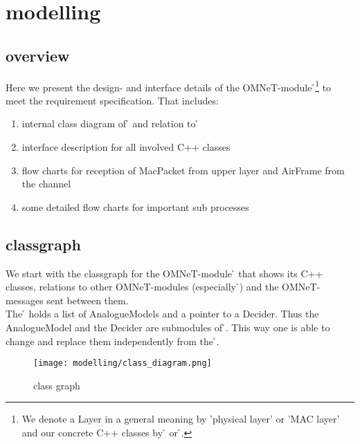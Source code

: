 \section{modelling}


\subsection{overview}

Here we present the design- and interface details of the OMNeT-module 
\h{\bp}\footnote{We denote a Layer in a general meaning by 'physical layer' or
 'MAC layer' and our concrete C++ classes
by \h{\bp} or \h{\bm}.} to meet the requirement specification. That includes:

\begin{enumerate}
 \item internal class diagram of \h{\bp} and relation to \h{\bm}
 \item interface description for all involved C++ classes
 \item flow charts for reception of MacPacket from upper layer and 
 AirFrame from the channel
 \item some detailed flow charts for important sub processes
\end{enumerate}


\subsection{classgraph}

We start with the classgraph for the OMNeT-module \h{\bp} that shows its C++ classes,
 relations to other OMNeT-modules (especially \h{\bm})
and the OMNeT-messages sent between them.\\

The \h{\bp} holds a list of AnalogueModels and a pointer
to a
Decider. Thus the AnalogueModel and the Decider are submodules of \h{\bp}. This
way one is able to change
and
replace them
independently from
the \h{\bp}.

\begin{landscape}
\begin{figure}
 \centering
 \texttt{[image: modelling/class\_diagram.png]}
 \caption{class graph}
 \label{fig: classgraph}
\end{figure}
\end{landscape} 


